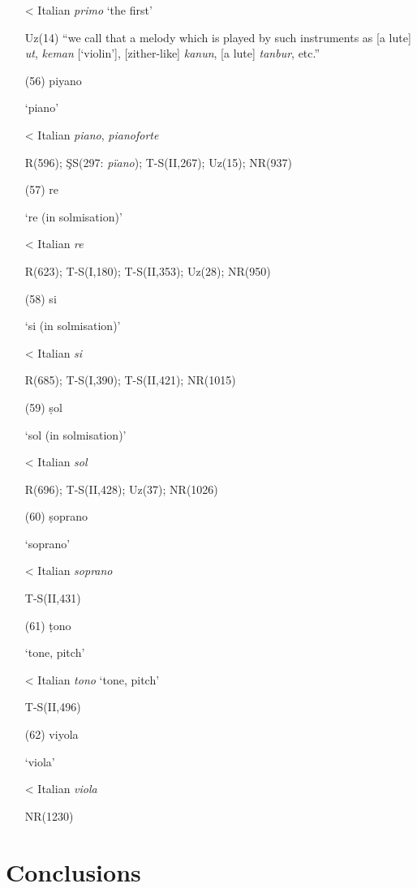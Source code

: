 \documentclass[output=paper,colorlinks,citecolor=brown,arabicfont,chinesefont]{langscibook}
\begin{document}
\begin{itemize}
    < Italian \emph{primo} ‘the first’

    Uz(14) “we call that a melody which is played by such instruments as [a lute] \emph{ut}, \emph{keman} [‘violin’], [zither-like] \emph{kanun}, [a lute] \emph{tanbur}, etc.”
    \item[(56)] piyano {} 

    ‘piano’

    < Italian \emph{piano}, \emph{pianoforte}

    R(596); ŞS(297: \emph{pïano}); T-S(II,267); Uz(15); NR(937)
    \item[(57)] re {}

    ‘re (in solmisation)’ 

    < Italian \emph{re}

    R(623); T-S(I,180); T-S(II,353); Uz(28); NR(950)
    \item[(58)] si {}

    ‘si (in solmisation)’ 

    < Italian \emph{si}

    R(685); T-S(I,390); T-S(II,421); NR(1015)
    \item[(59)] ṣol {}
    
    ‘sol (in solmisation)’ 
    
    < Italian \emph{sol}

    R(696); T-S(II,428); Uz(37); NR(1026) 
    \item[(60)] ṣoprano {}

    ‘soprano’

    < Italian \emph{soprano}

    T-S(II,431)
    \item[(61)] ṭono {} 

    ‘tone, pitch’

    < Italian \emph{tono} ‘tone, pitch’

    T-S(II,496)
    \item[(62)]	viyola {}

    ‘viola’

    < Italian \emph{viola} 

    NR(1230)
\end{itemize}

\section{Conclusions}\label{sec:pawlina:5}
\end{document}
